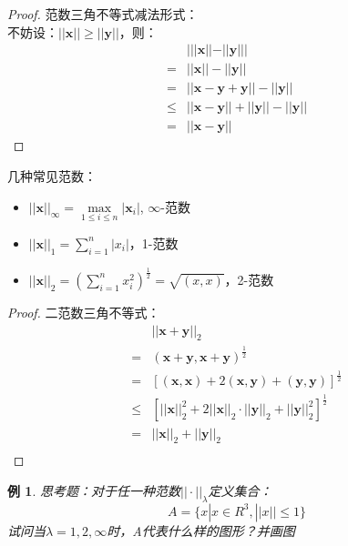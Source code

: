 \documentclass[a4paper]{article}
\newtheorem{example}{例}[section]
\begin{document}
\begin{proof}
范数三角不等式减法形式：\\
不妨设：$||\mathbf{x}|| \ge ||\mathbf{y}||$，则：
\begin{equation*}
\begin{split}
& |||\mathbf{x}||-||\mathbf{y}||| \\
=& ||\mathbf{x}|| - ||\mathbf{y}|| \\
=& ||\mathbf{x} - \mathbf{y} + \mathbf{y}|| - ||\mathbf{y}|| \\
\le& ||\mathbf{x} - \mathbf{y}|| + ||\mathbf{y}|| - ||\mathbf{y}|| \\
=& ||\mathbf{x} - \mathbf{y}||
\end{split}
\end{equation*}
\end{proof}


几种常见范数：
\begin{itemize}
\item $||\mathbf{x}||_\infty = \max \limits_{1\le i \le n}|\mathbf{x}_i|$, $\infty$-范数
\item $||\mathbf{x}||_1=\sum^{n}_{i=1}|x_i|$，1-范数
\item $||\mathbf{x}||_2=(\sum^n_{i=1}x_i^2)^\frac{1}{2}=\sqrt{(x,x)}$，2-范数
\end{itemize}


\begin{proof}
二范数三角不等式：\\
\begin{equation*}
\begin{split}
&||\mathbf{x}+\mathbf{y}||_2 \\
=& (\mathbf{x}+\mathbf{y}, \mathbf{x}+\mathbf{y})^{\frac{1}{2}} \\
=&[(\mathbf{x},\mathbf{x}) + 2(\mathbf{x}, \mathbf{y}) + (\mathbf{y}, \mathbf{y})]^{\frac{1}{2}} \\
\le& [||\mathbf{x}||^2_2 + 2||\mathbf{x}||_2\cdot||\mathbf{y}||_2 + ||\mathbf{y}||_2^2]^{\frac{1}{2}} \\
=& ||\mathbf{x}||_2+||\mathbf{y}||_2\\
\end{split}
\end{equation*}
\end{proof}

\begin{example}
思考题：对于任一种范数$||\cdot||_\lambda$定义集合：
$$A=\{x|x\in R^3, ||x|| \le 1\}$$
试问当$\lambda=1,2,\infty$时，A代表什么样的图形？并画图
\end{example}
\end{document}
